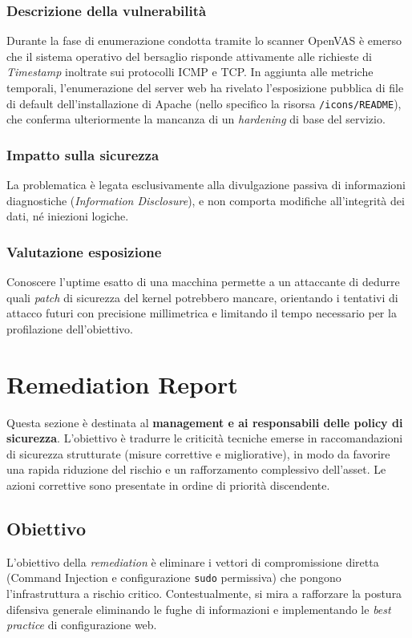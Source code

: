 \documentclass[11pt]{report}
\begin{document}
	\subsection{Descrizione della vulnerabilità}
	Durante la fase di enumerazione condotta tramite lo scanner OpenVAS è emerso che il sistema operativo del bersaglio risponde attivamente alle richieste di \textit{Timestamp} inoltrate sui protocolli ICMP e TCP. In aggiunta alle metriche temporali, l'enumerazione del server web ha rivelato l'esposizione pubblica di file di default dell'installazione di Apache (nello specifico la risorsa \texttt{/icons/README}), che conferma ulteriormente la mancanza di un \textit{hardening} di base del servizio.
	
	\subsection{Impatto sulla sicurezza}
	La problematica è legata esclusivamente alla divulgazione passiva di informazioni diagnostiche (\textit{Information Disclosure}), e non comporta modifiche all'integrità dei dati, né iniezioni logiche.
	
	\subsection{Valutazione esposizione}
	Conoscere l'uptime esatto di una macchina permette a un attaccante di dedurre quali \textit{patch} di sicurezza del kernel potrebbero mancare, orientando i tentativi di attacco futuri con precisione millimetrica e limitando il tempo necessario per la profilazione dell'obiettivo.
	
	
	\chapter{Remediation Report}
	Questa sezione è destinata al \textbf{management e ai responsabili delle policy di sicurezza}. L'obiettivo è tradurre le criticità tecniche emerse in raccomandazioni di sicurezza strutturate (misure correttive e migliorative), in modo da favorire una rapida riduzione del rischio e un rafforzamento complessivo dell'asset. Le azioni correttive sono presentate in ordine di priorità discendente.
	
	\section{Obiettivo}
	L'obiettivo della \textit{remediation} è eliminare i vettori di compromissione diretta (Command Injection e configurazione \texttt{sudo} permissiva) che pongono l'infrastruttura a rischio critico. Contestualmente, si mira a rafforzare la postura difensiva generale eliminando le fughe di informazioni e implementando le \textit{best practice} di configurazione web. 
	
\end{document}
